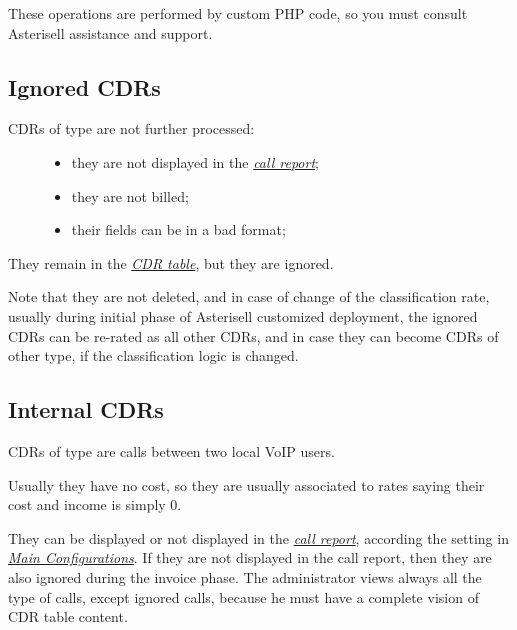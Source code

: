 \documentclass[letterpaper,10pt,english]{sphinxmanual}
\begin{document}
These operations are performed by custom PHP code, so you must consult Asterisell assistance and support.


\subsection{Ignored CDRs}
\label{index:ignored-cdrs}\begin{description}
\item[{CDRs of type  are not further processed:}] \leavevmode\begin{itemize}
\item {} 
they are not displayed in the {\hyperref[index:term-call-report]{\emph{call report}}};

\item {} 
they are not billed;

\item {} 
their fields can be in a bad format;

\end{itemize}

\end{description}

They remain in the {\hyperref[index:term-cdr-table]{\emph{CDR table}}}, but they are ignored.

Note that they are not deleted, and in case of change of the classification rate, usually during initial phase of Asterisell customized deployment, the ignored CDRs can be re-rated as all other CDRs, and in case they can become CDRs of other type, if the classification logic is changed.


\subsection{Internal CDRs}
\label{index:internal-cdrs}
CDRs of type  are calls between two local VoIP users.

Usually they have no cost, so they are usually associated to rates saying their cost and income is simply 0.

They can be displayed or not displayed in the {\hyperref[index:term-call-report]{\emph{call report}}}, according the setting  in {\hyperref[index:main-configurations]{\emph{Main Configurations}}}. If they are not displayed in the call report, then they are also ignored during the invoice phase. The administrator views always all the type of calls, except ignored calls, because he must have a complete vision of CDR table content.
\end{document}
